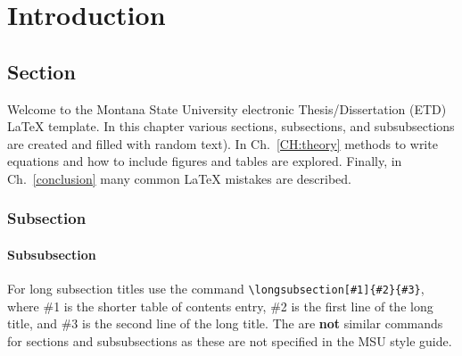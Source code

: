 \chapter{Introduction}\label{CH:introduction}


\section{Section}\label{Sect:test}
Welcome to the Montana State University electronic Thesis/Dissertation (ETD) \LaTeX{} template.  In this chapter various sections, subsections, and subsubsections are created and filled with random text).  In Ch.~\ref{CH:theory} methods to write equations and how to include figures and tables are explored.  Finally, in Ch.~\ref{conclusion} many common \LaTeX{} mistakes are described.

\subsection{Subsection}\label{Sect:testsub}
\lipsum[2] %

\subsubsection{Subsubsection}\label{Sect:testsubsub}
\lipsum[3] %


\label{Sect:longsub}
For long subsection titles use the command \verb|\longsubsection[#1]{#2}{#3}|, where \#1 is the shorter table of contents entry, \#2 is the first line of the long title, and \#3 is the second line of the long title. The are \textbf{not} similar commands for sections and subsubsections as these are not specified in the MSU style guide.


